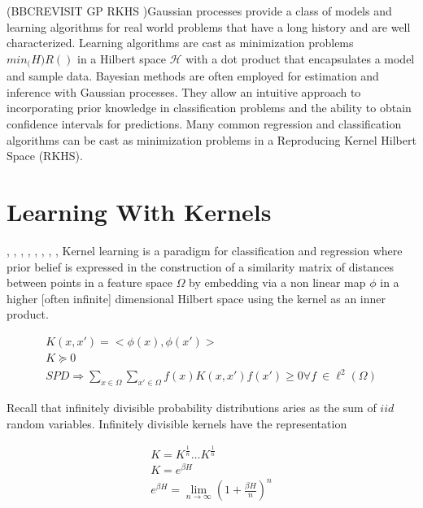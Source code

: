 \documentclass[a4paper]{article}
\theoremstyle{plain}
\theoremstyle{definition}
\theoremstyle{remark}
\numberwithin{equation}{section}
\begin{document}
(BBCREVISIT GP  RKHS )Gaussian processes provide a class of models and learning algorithms for real world problems that have a long history and are well characterized. Learning algorithms are cast as minimization problems $min_\mathcal(H) R() $ in a Hilbert space $ \mathcal{H}$ with a dot product that encapsulates a model and sample data.  Bayesian methods are often employed for estimation and inference with Gaussian processes. They allow an intuitive approach to incorporating prior knowledge in classification problems and the ability to obtain confidence intervals for predictions.  Many common regression and classification algorithms can be cast as minimization problems in a Reproducing Kernel Hilbert Space (RKHS).


\section{Learning With Kernels}
\cite{KLBurges98atutorial}, \cite{KLKeerthi99improvementsto}, \cite{KLProgramminglearningthe},
\cite{KLScholkopf00newsupport}, \cite{KLScholkopf00statisticallearning}, \cite{KLShevade99improvementsto},
\cite{KLTsang03distancemetric}, \cite{KLWeston00featureselection}, \cite{KLSchultz03learninga}
Kernel learning is a paradigm for classification and regression where prior belief is expressed in the construction of a similarity matrix of distances between points in a feature space $\Omega$ by embedding via a non linear map $\phi$ in a higher [often infinite] dimensional Hilbert space using the kernel as an inner product.
\begin{center}\begin{eqnarray*}
  K(x,x')= <\phi(x),\phi(x')> \\
  K \succeq 0 \\
  SPD \Rightarrow \sum\limits_{x \in \Omega}^{}  \sum\limits_{x' \in \Omega}^{} f(x) K(x,x') f(x') \geq 0 \forall f\ \in \ell^2(\Omega)
\end{eqnarray*}\end{center}
Recall that infinitely divisible probability distributions aries as the sum of $iid$ random variables.  Infinitely divisible kernels have the representation
\begin{center}\begin{eqnarray*}
K=K^{\frac{1}{n}} \ldots K^{\frac{1}{n}} \\
K= e^{\beta H} \\
e^{\beta H} = \lim\limits_{n\rightarrow \infty} (1+ \frac{\beta H}{n} )^n
\end{eqnarray*}\end{center}
\end{document}
